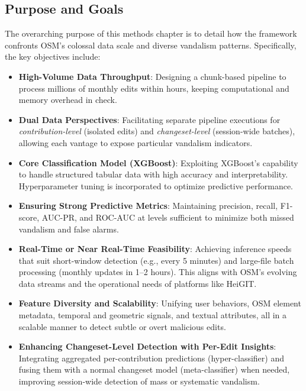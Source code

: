 \documentclass[
    13pt, %
    a4paper, %
    listof=totoc, %
    bibliography=totoc, %
    index=totoc, %
    headsepline
]{scrreprt}
\begin{document}
\subsection{Purpose and Goals}
\label{sec:purpose_and_goals}

The overarching purpose of this methods chapter is to detail how the framework confronts OSM’s colossal data scale and diverse vandalism patterns. Specifically, the key objectives include:

\begin{itemize}
    \item \textbf{High-Volume Data Throughput}:
    Designing a chunk-based pipeline to process millions of monthly edits within hours, keeping computational and memory overhead in check.
    \item \textbf{Dual Data Perspectives}:
    Facilitating separate pipeline executions for \emph{contribution-level} (isolated edits) and \emph{changeset-level} (session-wide batches), allowing each vantage to expose particular vandalism indicators.
    \item \textbf{Core Classification Model (XGBoost)}:
    Exploiting XGBoost’s capability to handle structured tabular data with high accuracy and interpretability. Hyperparameter tuning is incorporated to optimize predictive performance.
    \item \textbf{Ensuring Strong Predictive Metrics}:
    Maintaining precision, recall, F1-score, AUC-PR, and ROC-AUC at levels sufficient to minimize both missed vandalism and false alarms.
    \item \textbf{Real-Time or Near Real-Time Feasibility}:
    Achieving inference speeds that suit short-window detection (e.g., every 5 minutes) and large-file batch processing (monthly updates in 1--2 hours). This aligns with OSM’s evolving data streams and the operational needs of platforms like HeiGIT.
    \item \textbf{Feature Diversity and Scalability}:
    Unifying user behaviors, OSM element metadata, temporal and geometric signals, and textual attributes, all in a scalable manner to detect subtle or overt malicious edits.
    \item \textbf{Enhancing Changeset-Level Detection with Per-Edit Insights}:
    Integrating aggregated per-contribution predictions (hyper-classifier) and fusing them with a normal changeset model (meta-classifier) when needed, improving session-wide detection of mass or systematic vandalism.
\end{itemize}
\end{document}
